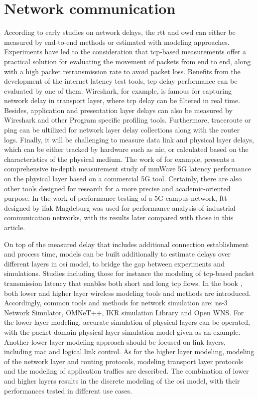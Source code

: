 \section{Network communication}
According to early studies on network delays, the \gls{rtt} and \gls{owd} 
can either be measured by end-to-end methods or estimated with modeling 
approaches. Experiments have led to the consideration that \gls{tcp}-based 
measurements offer a practical solution for evaluating the movement of 
packets from end to end, along with a high packet retransmission rate 
to avoid packet loss\cite{paxson_end--end_1999}. Benefits from 
the development of the internet latency test tools, \gls{tcp} delay 
performance can be evaluated by one of them. Wireshark, for example, is famous 
for capturing network delay in transport layer, where \gls{tcp} delay 
can be filtered in real time\cite{dsouza_transmission_2020}. Besides, 
application and presentation layer delays can also be measured by Wireshark and 
other Program 
specific profiling tools\cite{heger_application_2017}. Furthermore, 
traceroute or ping can be ultilized 
for network layer delay collections along with the router logs\cite{Deri2003}. 
Finally, it will be challenging to measure 
data link and physical layer delays, which can be either tracked by hardware 
such as \gls{nic}, or calculated based on the characteristics 
of the physical medium. The work of \cite{Fezeu2023} for example, 
presents a comprehensive 
in-depth measurement study of mmWave 5G latency performance on the physical layer 
based on a commercial 5G tool.   
Certainly, there are also other tools designed for research for a more 
precise and academic-oriented purpose. In the work of performance testing 
of a 5G campus network, \gls{ftt} designed by ifak Magdeburg was used 
for performance analysis of industrial communication networks\cite{cainelli_performance_2023}, 
with its results later compared with those in this article.


On top of the measured delay 
that includes additional connection establishment and process time, 
models can be built additionally to estimate delays over different layers in 
\gls{osi} model, to bridge the gap between experiments and simulations. 
Studies including those for instance the modeling of \gls{tcp}-based 
packet transmission latency that enables both short and 
long \gls{tcp} flows\cite{luan_estimating_2019}. In the book \cite{wehrle2010modeling}, 
both lower and higher layer wireless modeling tools and methods are introduced. 
Accordingly, common tools and methods for network simulation are: ns-3 Network Simulator, OMNeT++, 
IKR simulation Library and Open WNS. For the lower layer modeling, accurate simulation 
of physical layers can be operated, with the packet domain physical layer simulation 
model given as an example. Another lower layer modeling approach should be focused on 
link layers, including \gls{mac} and logical link control. As for the higher layer 
modeling, modeling of the network layer and routing protocols, modeling 
transport layer protocols and the modeling of application traffics are described. 
The combination of lower and higher layers results in the discrete modeling 
of the \gls{osi} model, with their performances tested in different use cases. 




